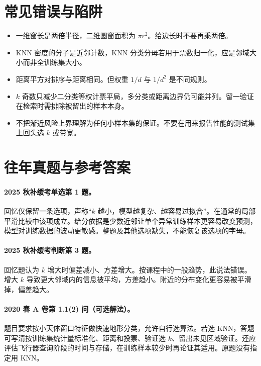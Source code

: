 \documentclass[UTF8,a4paper,zihao=-4,fontset=fandol]{ctexrep}
\begin{document}
\section{常见错误与陷阱}
\begin{itemize}
\item 一维窗长是两倍半径，二维圆窗面积为 $\pi r^2$。给边长时不要再乘两倍。
\item KNN 密度的分子是近邻计数，KNN 分类分母若用于票数归一化，应是邻域大小而非全训练集大小。
\item 距离平方对排序与距离相同。但权重 $1/d$ 与 $1/d^2$ 是不同规则。
\item $k$ 奇数只减少二分类等权计票平局，多分类或距离边界仍可能并列。留一验证在检索时需排除被留出的样本本身。
\item 不把渐近风险上界理解为任何小样本集的保证。不要在用来报告性能的测试集上回头选 $k$ 或带宽。
\end{itemize}

\section{往年真题与参考答案}
\paragraph{2025 秋补缓考单选第 1 题。} 回忆仅保留一条选项，声称“$k$ 越小，模型越复杂、越容易过拟合”。在通常的局部平滑比较中该项成立。给分依据是少数近邻让单个异常训练样本更容易改变预测，模型对训练数据的波动更敏感。整题及其他选项缺失，不能恢复该选项的字母。
\paragraph{2025 秋补缓考判断第 3 题。} 回忆题认为 $k$ 增大时偏差减小、方差增大。按课程中的一般趋势，此说法错误。增大 $k$ 导致更大邻域内的信息被平均，方差趋小。附近的分布变化更容易被平滑掉，偏差趋大。
\paragraph{2020 春 A 卷第 1.1(2) 问（可选解法）。} 题目要求按小天体窗口特征做快速地形分类，允许自行选算法。若选 KNN，答题可写清按训练集统计量标准化、距离和投票、验证选 $k$、留出未见区域验证。还应评估飞行器查询阶段的时间与存储，在训练样本较少时再论证其适用。原题没有指定用 KNN。
\end{document}

